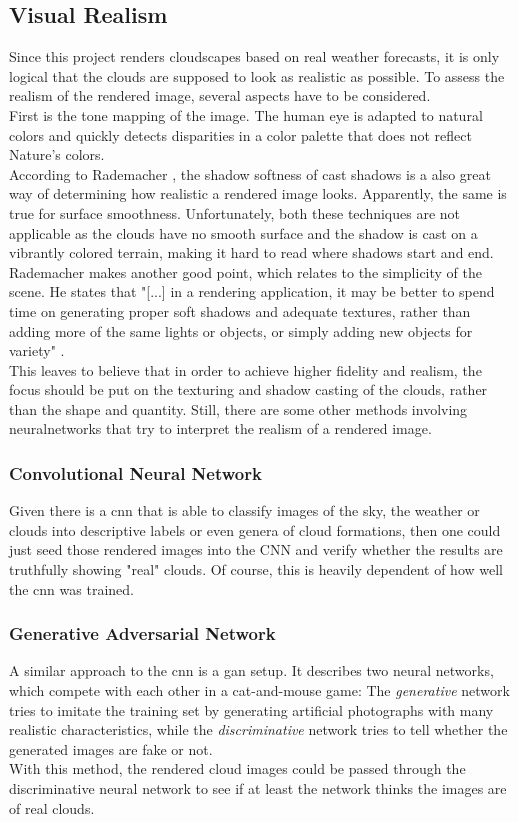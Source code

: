 \subsection{Visual Realism}
\label{section:techimpl:measure}
Since this project renders cloudscapes based on real weather forecasts, it is only logical that the clouds are supposed to look as realistic as possible.
To assess the realism of the rendered image, several aspects have to be considered.
\\
First is the tone mapping of the image. The human eye is adapted to natural colors and quickly detects disparities in a color palette that does not reflect Nature's colors.
\\
According to Rademacher \cite{diglib:realism}, the shadow softness of cast shadows is a also great way of determining how realistic a rendered image looks.
Apparently, the same is true for surface smoothness.
Unfortunately, both these techniques are not applicable as the clouds have no smooth surface and the shadow is cast on a vibrantly colored terrain, making it hard to read where shadows start and end.
\\
Rademacher makes another good point, which relates to the simplicity of the scene.
He states that "[...] in a rendering application, it may be better to spend time on generating proper soft shadows and adequate textures, rather than adding more of the same lights
or objects, or simply adding new objects for variety" \cite{diglib:realism2}.
\\
This leaves to believe that in order to achieve higher fidelity and realism, the focus should be put on the texturing and shadow casting of the clouds, rather than the shape and quantity.
\emptyline
Still, there are some other methods involving \gls{neuralnetwork}s that try to interpret the realism of a rendered image.

\subsubsection{Convolutional Neural Network}
Given there is a \gls{cnn} that is able to classify images of the sky, the weather or clouds into descriptive labels or even genera of cloud formations, then one could just seed those rendered images into the CNN and verify whether the results are truthfully showing "real" clouds.
Of course, this is heavily dependent of how well the \gls{cnn} was trained.

\subsubsection{Generative Adversarial Network}
A similar approach to the \gls{cnn} is a \gls{gan} setup. It describes two neural networks, which compete with each other in a cat-and-mouse game: The \textit{generative} network tries to imitate the training set by generating artificial photographs with many realistic characteristics, while the \emph{discriminative} network tries to tell whether the generated images are fake or not.
\\
With this method, the rendered cloud images could be passed through the discriminative neural network to see if at least the network thinks the images are of real clouds.

